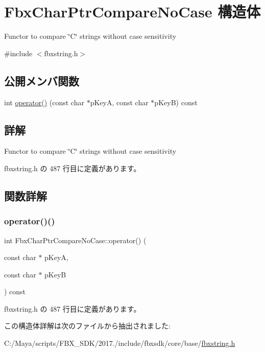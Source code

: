 \hypertarget{struct_fbx_char_ptr_compare_no_case}{}\section{Fbx\+Char\+Ptr\+Compare\+No\+Case 構造体}
\label{struct_fbx_char_ptr_compare_no_case}


Functor to compare \char`\"{}\+C\char`\"{} strings without case sensitivity  




{\ttfamily \#include $<$fbxstring.\+h$>$}

\subsection*{公開メンバ関数}
\begin{DoxyCompactItemize}
\item 
int \hyperlink{struct_fbx_char_ptr_compare_no_case_a23d4e5b52cb08b712b8f5a72f659bccc}{operator()} (const char $\ast$p\+KeyA, const char $\ast$p\+KeyB) const
\end{DoxyCompactItemize}


\subsection{詳解}
Functor to compare \char`\"{}\+C\char`\"{} strings without case sensitivity 

 fbxstring.\+h の 487 行目に定義があります。



\subsection{関数詳解}
\mbox{\label{struct_fbx_char_ptr_compare_no_case_a23d4e5b52cb08b712b8f5a72f659bccc}} 
\subsubsection{\texorpdfstring{operator()()}{operator()()}}
{\footnotesize\ttfamily int Fbx\+Char\+Ptr\+Compare\+No\+Case\+::operator() (\begin{DoxyParamCaption}\item[{const char $\ast$}]{p\+KeyA,  }\item[{const char $\ast$}]{p\+KeyB }\end{DoxyParamCaption}) const\hspace{0.3cm}{\ttfamily [inline]}}



 fbxstring.\+h の 487 行目に定義があります。



この構造体詳解は次のファイルから抽出されました\+:\begin{DoxyCompactItemize}
\item 
C\+:/\+Maya/scripts/\+F\+B\+X\+\_\+\+S\+D\+K/2017./include/fbxsdk/core/base/\hyperlink{fbxstring_8h}{fbxstring.\+h}\end{DoxyCompactItemize}
